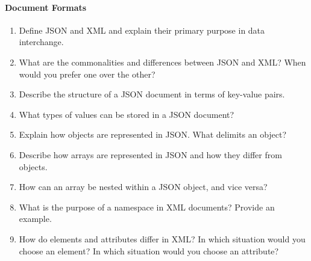 \paragraph*{Document Formats}
\begin{enumerate}
    \item Define JSON and XML and explain their primary purpose in data interchange.
    \item What are the commonalities and differences between JSON and XML? When would you prefer one over the other?
    \item Describe the structure of a JSON document in terms of key-value pairs.
    \item What types of values can be stored in a JSON document?
    \item Explain how objects are represented in JSON. What delimits an object?
    \item Describe how arrays are represented in JSON and how they differ from objects.
    \item How can an array be nested within a JSON object, and vice versa?
    \item What is the purpose of a namespace in XML documents? Provide an example.
    \item How do elements and attributes differ in XML? In which situation would you choose an element? In which situation would you choose an attribute?
\end{enumerate}
